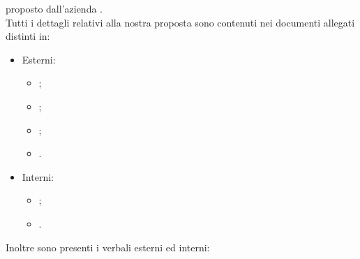 \documentclass[a4paper, oneside, openany, dvipsnames, table,11pt]{letter}
\begin{document}
\begin{letter}
\begin{center}
           \textbf{\NomeProgetto{}} 
        \end{center}
        proposto dall'azienda \textbf{\proponente{}}.\\
        Tutti i dettagli relativi alla nostra proposta sono contenuti nei documenti allegati distinti in:
        \begin{itemize}
            \item Esterni:
            \begin{itemize}
                \item \AdRv{};
                \item \Gv{};
                \item \PdPv{};
                \item \PdQv{}.
            \end{itemize}
            \item Interni:
            \begin{itemize}
                \item \NdPv{};
                \item \SdFv{}.
            \end{itemize}
        \end{itemize}
        Inoltre sono presenti i verbali esterni ed interni:
        \begin{itemize}
            

\end{itemize}
\end{letter}
\end{document}
